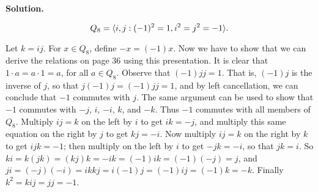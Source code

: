 \begin{enumerate}
      \textbf{Solution.}
         
      $$Q_8 = \langle i, j : (-1)^2 = 1, i^2 = j^2 = -1 \rangle.$$

      Let $k = ij$. For $x \in Q_8$, define $-x = (-1)x$. Now we have to show 
      that we can derive the relations on page 36 using this presentation.  It
      is clear that $1 \cdot a = a \cdot 1 = a$, for all $a \in Q_8$. Observe
      that $(-1)jj = 1$. That is, $(-1)j$ is the inverse of $j$, so that
      $j(-1)j = (-1)jj = 1$, and by left cancellation, we can conclude that
      $-1$ commutes with $j$. The same argument can be used to show that $-1$ 
      commutes with $-j$, $i$, $-i$, $k$, and $-k$. Thus $-1$ commutes with all
      members of $Q_8$. Multiply $ij = k$ on the left by $i$ to get $ik = -j$,
      and multiply this same equation on the right by $j$ to get $kj = -i$. Now
      multiply $ij = k$ on the right by $k$ to get $ijk = -1$; then multiply on
      the left by $i$ to get $-jk = -i$, so that $jk = i$. So
      $ki = k(jk) = (kj)k = -ik = (-1)ik = (-1)(-j) = j$, and
      $ji = (-j)(-i) = ikkj = i(-1)j = (-1)ij = (-1)k = -k$. Finally
      $k^2 = kij = jj = -1$.
\end{enumerate}
